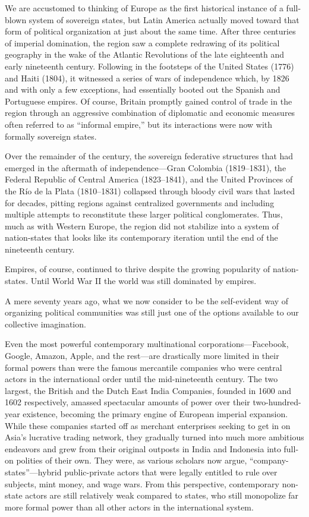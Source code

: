 \documentclass[
]{book}
\begin{document}
We are accustomed to thinking of Europe as the first historical instance of a full-blown system of sovereign states, but Latin America actually moved toward that form of political organization at just about the same time.
After three centuries of imperial domination, the region saw a complete redrawing of its political geography in the wake of the Atlantic Revolutions of the late eighteenth and early nineteenth century. Following in the footsteps of the United States (1776) and Haiti (1804), it witnessed a series of wars of independence which, by 1826 and with only a few exceptions, had essentially booted out the Spanish and Portuguese empires. Of course, Britain promptly gained control of trade in the region through an aggressive combination of diplomatic and economic measures often referred to as ``informal empire,'' but its interactions were now with formally sovereign states.

Over the remainder of the century, the sovereign federative structures that had emerged in the aftermath of independence---Gran Colombia (1819--1831), the Federal Republic of Central America (1823--1841), and the United Provinces of the Río de la Plata (1810--1831) collapsed through bloody civil wars that lasted for decades, pitting regions against centralized governments and including multiple attempts to reconstitute these larger political conglomerates. Thus, much as with Western Europe, the region did not stabilize into a system of nation-states that looks like its contemporary iteration until the end of the nineteenth century.

Empires, of course, continued to thrive despite the growing popularity of nation-states. Until World War II the world was still dominated by empires.

A mere seventy years ago, what we now consider to be the self-evident way of organizing political communities was still just one of the options available to our collective imagination.

Even the most powerful contemporary multinational corporations---Facebook, Google, Amazon, Apple, and the rest---are drastically more limited in their formal powers than were the famous mercantile companies who were central actors in the international order until the mid-nineteenth century. The two largest, the British and the Dutch East India Companies, founded in 1600 and 1602 respectively, amassed spectacular amounts of power over their two-hundred-year existence, becoming the primary engine of European imperial expansion.
While these companies started off as merchant enterprises seeking to get in on Asia's lucrative trading network, they gradually turned into much more ambitious endeavors and grew from their original outposts in India and Indonesia into full-on polities of their own. They were, as various scholars now argue, ``company-states''---hybrid public-private actors that were legally entitled to rule over subjects, mint money, and wage wars. From this perspective, contemporary non-state actors are still relatively weak compared to states, who still monopolize far more formal power than all other actors in the international system.
\end{document}
